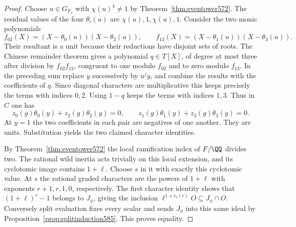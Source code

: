 \documentclass[a4paper,11pt]{article}
\theoremstyle{definition}
\theoremstyle{remark}
\numberwithin{equation}{section}
\begin{document}
\begin{proof}
Choose \(u\in G_{F_v}\) with \(\chi(u)^4\ne1\) by
Theorem~\ref{thm:eventower572}. The residual values of the
four \(\theta_i(u)\) are \(\chi(u),1,\chi(u),1\). Consider
the two monic polynomials
\[
       f_{02}(X)=(X-\theta_0(u))(X-\theta_2(u)),\qquad
       f_{13}(X)=(X-\theta_1(u))(X-\theta_3(u)).
\]
Their resultant is a unit because their reductions have disjoint
sets of roots. The Chinese remainder theorem gives a polynomial
\(q\in T[X]\), of degree at most three after division by
\(f_{02}f_{13}\), congruent to one modulo \(f_{02}\) and to zero modulo
\(f_{13}\). In the preceding sum replace \(y\) successively by
\(u^j y\), and combine the results with the coefficients
of \(q\). Since diagonal characters are multiplicative this
keeps precisely the terms with indices \(0,2\). Using \(1-q\)
keeps the terms with indices \(1,3\). Thus in \(C\) one has
\[
     z_0(g)\theta_0(y)+z_2(g)\theta_2(y)=0,\qquad
     z_1(g)\theta_1(y)+z_3(g)\theta_3(y)=0 .
\]
At \(y=1\) the two coefficients in each pair are negatives
of one another. They are units. Substitution yields the two
claimed character identities.

By Theorem~\ref{thm:eventower572} the local ramification index
of \(F/\QQ\) divides two. The rational wild inertia acts
trivially on this local extension, and its cyclotomic image
contains \(1+\ell\). Choose \(s\) in it with exactly this
cyclotomic value. At \(s\) the rational graded characters
are the powers of \(1+\ell\) with exponents \(r+1,r,1,0\),
respectively. The first character identity shows that
\((1+\ell)^r-1\) belongs to \(J_\phi\), giving the inclusion
\(\ell^{1+v_\ell(r)}O\subseteq J_\phi\cap O\).
Conversely split evaluation fixes every scalar and sends
\(J_\phi\) into this same ideal by
Proposition~\ref{prop:splitinduction585}. This proves equality.
\end{proof}
\end{document}
